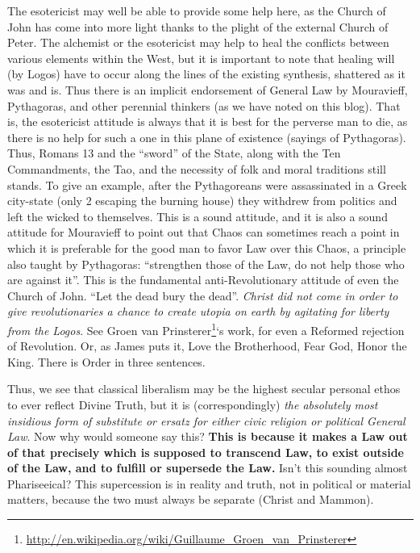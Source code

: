 The esotericist may well be able to provide some help here, as the Church of John has come into more light thanks to the plight of the external Church of Peter. The alchemist or the esotericist may help to heal the conflicts between various elements within the West, but it is important to note that healing will (by Logos) have to occur along the lines of the existing synthesis, shattered as it was and is. Thus there is an implicit endorsement of General Law by Mouravieff, Pythagoras, and other perennial thinkers (as we have noted on this blog). That is, the esotericist attitude is always that it is best for the perverse man to die, as there is no help for such a one in this plane of existence (sayings of Pythagoras). Thus, Romans 13 and the ``sword'' of the State, along with the Ten Commandments, the Tao, and the necessity of folk and moral traditions still stands. To give an example, after the Pythagoreans were assassinated in a Greek city-state (only 2 escaping the burning house) they withdrew from politics and left the wicked to themselves. This is a sound attitude, and it is also a sound attitude for Mouravieff to point out that Chaos can sometimes reach a point in which it is preferable for the good man to favor Law over this Chaos, a principle also taught by Pythagoras: ``strengthen those of the Law, do not help those who are against it''. This is the fundamental anti-Revolutionary attitude of even the Church of John. ``Let the dead bury the dead''. \emph{Christ did not come in order to give revolutionaries a chance to create utopia on earth by agitating for liberty from the Logos}. See Groen van Prinsterer\footnote{\url{http://en.wikipedia.org/wiki/Guillaume\_Groen\_van\_Prinsterer}}`s work, for even a Reformed rejection of Revolution. Or, as James puts it, Love the Brotherhood, Fear God, Honor the King. There is Order in three sentences.

Thus, we see that classical liberalism may be the highest secular personal ethos to ever reflect Divine Truth, but it is (correspondingly) \emph{the absolutely most insidious form of substitute or ersatz for either civic religion or political General Law}. Now why would someone say this? \textbf{This is because it makes a Law out of that precisely which is supposed to transcend Law, to exist outside of the Law, and to fulfill or supersede the Law.} Isn't this sounding almost Phariseeical? This supercession is in reality and truth, not in political or material matters, because the two must always be separate (Christ and Mammon).

